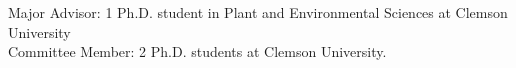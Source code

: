 

\cvsummarytext
{Major Advisor: 1 Ph.D. student in Plant and Environmental Sciences at Clemson University \\
  Committee Member: 2 Ph.D. students at Clemson University.}
{}

